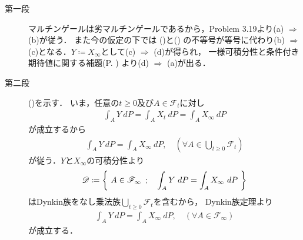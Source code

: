 	\begin{prf}\mbox{}
		\begin{description}
			\item[第一段] マルチンゲールは劣マルチンゲールであるから，Problem 3.19より(a) $\Rightarrow$ (b)が従う．
				また今の仮定の下では
				()と()
				の不等号が等号に代わり(b) $\Rightarrow$ (c)となる．$Y \coloneqq X_\infty$として(c) $\Rightarrow$ (d)が得られ，
				一様可積分性と条件付き期待値に関する補題(P. \pageref{lem:uniformly_integrability_and_conditional_expectations})
				より(d) $\Rightarrow$ (a)が出る．
				
			\item[第二段]
				()を示す．
				いま，任意の$t \geq 0$及び$A \in \mathscr{F}_t$に対し
				\begin{align}
					\int_A Y\ dP = \int_A X_t\ dP = \int_A X_\infty\ dP
				\end{align}
				が成立するから
				\begin{align}
					\int_A Y\ dP = \int_A X_\infty\ dP,
					\quad (\forall A \in \bigcup_{t \geq 0} \mathscr{F}_t)
				\end{align}
				が従う．$Y$と$X_\infty$の可積分性より
				\begin{align}
					\mathscr{D} \coloneqq
					\left\{\ A \in \mathscr{F}_\infty\ \, ; \quad \int_A Y\ dP = \int_A X_\infty\ dP\ \right\}
				\end{align}
				はDynkin族をなし乗法族$\bigcup_{t \geq 0} \mathscr{F}_t$を含むから，
				Dynkin族定理より
				\begin{align}
					\int_A Y\ dP = \int_A X_\infty\ dP,
					\quad (\forall A \in \mathscr{F}_\infty)
				\end{align}
				が成立する．
				\QED
		\end{description}
	\end{prf}
